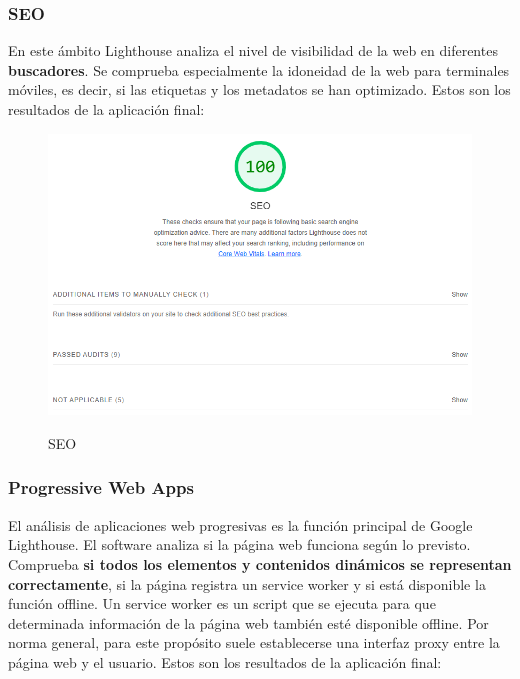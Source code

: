 \documentclass[12pt,twoside,titlepage]{report}
\begin{document}
\subsubsection{SEO}

En este ámbito Lighthouse analiza el nivel de visibilidad de la web en diferentes \textbf{buscadores}. Se comprueba especialmente la idoneidad de la web para terminales móviles, es decir, si las etiquetas y los metadatos se han optimizado. Estos son los resultados de la aplicación final:

\begin{figure}[H]
    \centering
    \includegraphics[scale=0.6]{Lighthouse/SEO}
    \label{fig:Lighthouse_seo}
    \caption{SEO}
\end{figure}

\subsubsection{Progressive Web Apps}

El análisis de aplicaciones web progresivas es la función principal de Google Lighthouse. El software analiza si la página web funciona según lo previsto. Comprueba \textbf{si todos los elementos y contenidos dinámicos se representan correctamente}, si la página registra un service worker y si está disponible la función offline. Un service worker es un script que se ejecuta para que determinada información de la página web también esté disponible offline. Por norma general, para este propósito suele establecerse una interfaz proxy entre la página web y el usuario. Estos son los resultados de la aplicación final:
\end{document}
